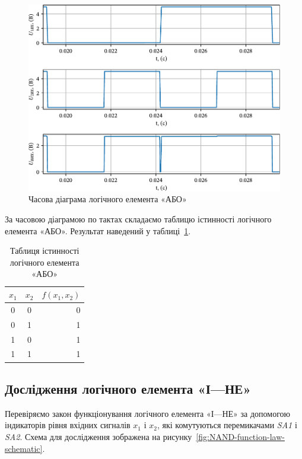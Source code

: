\documentclass[a4paper,oneside,DIV=10,12pt]{scrartcl}
\newcommand\schel[1]{\textit{#1}}
\begin{document}
			\begin{figure}[!htbp]
			\centering
				\includegraphics[width=\textwidth]{plots/03-pdf/03-OR-time-diagram-edited.pdf}
			\caption{Часова діаграма логічного елемента «АБО»}
			\label{fig:OR-time-diagram}
			\end{figure}
			
			За часовою діаграмою по тактах складаємо таблицю істинності логічного елемента «АБО». Результат наведений у таблиці~\ref{fig:OR-truth-table}.
			
			\begin{table}[!htbp]
			\centering
				\begin{tabular}{ccr}
					\toprule
						$x_1$ & $x_2$ & $f(x_1, x_2)$\\
					\midrule
						0     & 0     & 0\\
						0     & 1     & 1\\
						1     & 0     & 1\\
						1     & 1     & 1\\
					\bottomrule
				\end{tabular}
			\caption{Таблиця істинності логічного елемента «АБО»}
			\label{fig:OR-truth-table}
			\end{table}
			
		\subsection{Дослідження логічного елемента «І—НЕ»}
			Перевіряємо закон функціонування логічного елемента «І—НЕ» за допомогою індикаторів рівня вхідних сигналів $x_1$ і $x_2$, які комутуються перемикачами \schel{SA1} і \schel{SA2}. Схема для дослідження зображена на рисунку~\ref{fig:NAND-function-law-schematic}.
			
\end{document}
